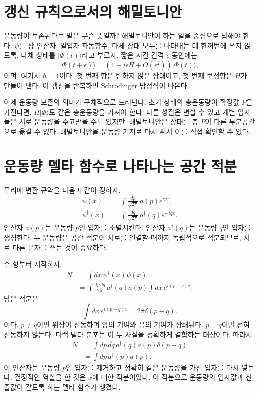 \section{갱신 규칙으로서의 해밀토니안}

운동량이 보존된다는 말은 무슨 뜻일까? 해밀토니안이 하는 일을 중심으로 답해야 한다. \(\psi\)를 장 연산자, 일입자 파동함수, 다체 상태 모두를 나타내는 데 한꺼번에 쓰지 않도록, 다체 상태를 \(\lvert\Phi(t)\rangle\)라고 부르자. 짧은 시간 간격 \(\epsilon\) 동안에는
\begin{equation}
\lvert\Phi(t+\epsilon)\rangle
=\left(1-i\epsilon H+O(\epsilon^2)\right)
\lvert\Phi(t)\rangle,
\label{eq:l9-short-update}
\end{equation}
이며, 여기서 \(\hbar=1\)이다. 첫 번째 항은 변하지 않은 상태이고, 첫 번째 보정항은 \(H\)가 만들어 낸다. 이 갱신을 반복하면 Schr\"odinger 방정식이 나온다.

이제 운동량 보존의 의미가 구체적으로 드러난다. 초기 상태의 총운동량이 확정값 \(P\)을 가진다면, \(H\lvert\Phi\rangle\)도 같은 총운동량을 가져야 한다. 다른 성질은 변할 수 있고 개별 입자들은 서로 운동량을 주고받을 수도 있지만, 해밀토니안은 상태를 총 \(P\)이 다른 부분공간으로 옮길 수 없다. 해밀토니안을 운동량 기저로 다시 써서 이를 직접 확인할 수 있다.

\section{운동량 델타 함수로 나타나는 공간 적분}

푸리에 변환 규약을 다음과 같이 정하자.
\begin{align}
\psi(x)&=\int\frac{dp}{\sqrt{2\pi}}\,a(p)e^{ipx},\\
\psi^\dagger(x)&=\int\frac{dq}{\sqrt{2\pi}}\,a^\dagger(q)e^{-iqx}.
\label{eq:l9-field-fourier}
\end{align}
연산자 \(a(p)\)는 운동량 \(p\)인 입자를 소멸시킨다. 연산자 \(a^\dagger(q)\)는 운동량 \(q\)인 입자를 생성한다. 두 운동량은 공간 적분이 서로를 연결할 때까지 독립적으로 적분되므로, 서로 다른 문자를 쓰는 것이 중요하다.

수 항부터 시작하자.
\begin{align}
N
&=\int dx\,\psi^\dagger(x)\psi(x)\\
&=\int\frac{dp\,dq}{2\pi}\,
a^\dagger(q)a(p)
\int dx\,e^{i(p-q)x}.
\end{align}
남은 적분은
\begin{equation}
\int dx\,e^{i(p-q)x}=2\pi\delta(p-q).
\end{equation}
이다. \(p\ne q\)이면 위상이 진동하며 양의 기여와 음의 기여가 상쇄된다. \(p=q\)이면 전혀 진동하지 않는다. 디랙 델타 분포는 이 두 사실을 정확하게 결합하는 대상이다. 따라서
\begin{align}
N
&=\int dp\,dq\,a^\dagger(q)a(p)\delta(p-q)\\
&=\int dp\,a^\dagger(p)a(p).
\label{eq:l9-number-momentum}
\end{align}
이 연산자는 운동량 \(p\)인 입자를 제거하고 정확히 같은 운동량을 가진 입자를 다시 넣는다. 결정적인 역할을 한 것은 \(x\)에 대한 적분이었다. 이 적분으로 운동량의 입사값과 산출값이 같도록 하는 델타 함수가 생겼다.

